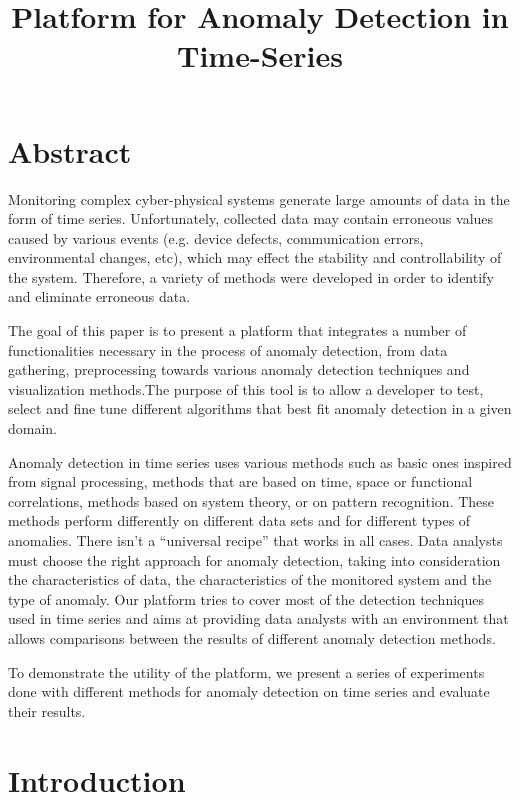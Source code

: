 \documentclass{article}
\title{Platform for Anomaly Detection in Time-Series}
\begin{document}
\maketitle

\section*{Abstract}

Monitoring complex cyber-physical systems generate large amounts of data in the form of time series. Unfortunately, collected data may contain erroneous values caused by various events (e.g. device defects, communication errors, environmental changes, etc), which may effect the stability and controllability of the system. Therefore, a variety of methods were developed in order to identify and eliminate erroneous data.

The goal of this paper is to present a platform that integrates a number of functionalities necessary in the process of anomaly detection, from data gathering, preprocessing towards various anomaly detection techniques and visualization methods.The purpose of this tool is to allow a developer to test, select and fine tune different algorithms that best fit anomaly detection in a given domain.

Anomaly detection in time series uses various methods such as basic ones inspired from signal processing, methods that are based on time, space or functional correlations, methods based on system theory, or on pattern recognition. These methods perform differently on different data sets and for different types of anomalies. There isn't a ``universal recipe'' that works in all cases. Data analysts must choose the right approach for anomaly detection, taking into consideration the characteristics of data, the characteristics of the monitored system and the type of anomaly. Our platform tries to cover most of the detection techniques used in time series and aims at providing data analysts with an environment that allows comparisons between the results of different anomaly detection methods.

To demonstrate the utility of the platform, we present a series of experiments done with different methods for anomaly detection on time series and evaluate their results.

\section{Introduction}
\end{document}
